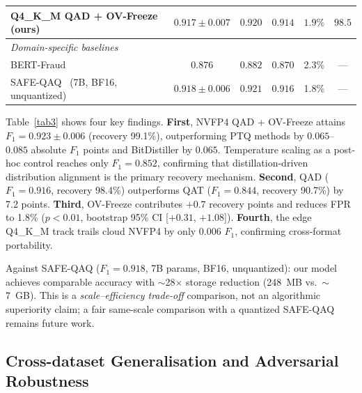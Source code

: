 \documentclass[lettersize,journal]{IEEEtran}
\begin{document}
\begin{table}[!t]
\begin{tabularx}{\textwidth}{Xccccc}
\rowcolor[gray]{0.93}\textbf{Q4\_K\_M QAD + OV-Freeze (ours)}
  & $\mathbf{0.917\pm0.007}$ & $\mathbf{0.920}$ & $\mathbf{0.914}$
  & $\mathbf{1.9\%}$ & $\mathbf{98.5}$ \\
\midrule
\multicolumn{6}{l}{\emph{Domain-specific baselines}} \\
BERT-Fraud~\cite{16}     & $0.876$ & $0.882$ & $0.870$ & 2.3\% & --- \\
SAFE-QAQ~\cite{2} (7B, BF16, unquantized)
  & $0.918\pm0.006$ & $0.921$ & $0.916$ & 1.8\% & --- \\
\bottomrule
\end{tabularx}
\end{table}

Table~\ref{tab3} shows four key findings.  \textbf{First}, NVFP4 QAD
+ OV-Freeze attains $F_1=0.923\pm0.006$ (recovery 99.1\%), outperforming
PTQ methods by $0.065$--$0.085$ absolute $F_1$ points and BitDistiller
by $0.065$.  Temperature scaling as a post-hoc control reaches only
$F_1=0.852$, confirming that distillation-driven distribution
alignment is the primary recovery mechanism.  \textbf{Second}, QAD
($F_1=0.916$, recovery 98.4\%) outperforms QAT ($F_1=0.844$, recovery
90.7\%) by 7.2 points.  \textbf{Third}, OV-Freeze contributes
$+0.7$ recovery points and reduces FPR to 1.8\% ($p<0.01$, bootstrap
95\% CI [$+0.31$, $+1.08$]).  \textbf{Fourth}, the edge Q4\_K\_M
track trails cloud NVFP4 by only $0.006$ $F_1$, confirming
cross-format portability.

Against SAFE-QAQ ($F_1=0.918$, 7B params, BF16, unquantized):
our model achieves comparable accuracy with $\sim$28$\times$ storage
reduction (248~MB vs.\ $\sim$7~GB).  This is a \emph{scale--efficiency
trade-off} comparison, not an algorithmic superiority claim; a
fair same-scale comparison with a quantized SAFE-QAQ remains future
work.

\subsection{Cross-dataset Generalisation and Adversarial Robustness}
\end{document}
